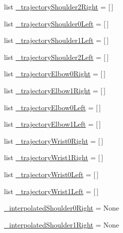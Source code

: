 \begin{DoxyCompactItemize}
\item 
list \mbox{\hyperlink{namespaceinterpolate__steering_a984704ca172938a3761ed9b8233b1003}{\+\_\+trajectory\+Shoulder2\+Right}} = \mbox{[}$\,$\mbox{]}
\item 
list \mbox{\hyperlink{namespaceinterpolate__steering_aafc3bda17692573f1820e027906092e8}{\+\_\+trajectory\+Shoulder0\+Left}} = \mbox{[}$\,$\mbox{]}
\item 
list \mbox{\hyperlink{namespaceinterpolate__steering_a1797f2fa979e7e61df487f39afedd774}{\+\_\+trajectory\+Shoulder1\+Left}} = \mbox{[}$\,$\mbox{]}
\item 
list \mbox{\hyperlink{namespaceinterpolate__steering_ae4675bfff9acc9e5c71a92a7c939e806}{\+\_\+trajectory\+Shoulder2\+Left}} = \mbox{[}$\,$\mbox{]}
\item 
list \mbox{\hyperlink{namespaceinterpolate__steering_adaec758772276334d0523a1e9df71bb3}{\+\_\+trajectory\+Elbow0\+Right}} = \mbox{[}$\,$\mbox{]}
\item 
list \mbox{\hyperlink{namespaceinterpolate__steering_a930787d860b6af317444782ecbee029d}{\+\_\+trajectory\+Elbow1\+Right}} = \mbox{[}$\,$\mbox{]}
\item 
list \mbox{\hyperlink{namespaceinterpolate__steering_a0b98550c1629af1c58085eb4a21257c5}{\+\_\+trajectory\+Elbow0\+Left}} = \mbox{[}$\,$\mbox{]}
\item 
list \mbox{\hyperlink{namespaceinterpolate__steering_af53acb14d7677debb5bfcc89f3655e45}{\+\_\+trajectory\+Elbow1\+Left}} = \mbox{[}$\,$\mbox{]}
\item 
list \mbox{\hyperlink{namespaceinterpolate__steering_a946f9edfdf829439d0735e9a7703de44}{\+\_\+trajectory\+Wrist0\+Right}} = \mbox{[}$\,$\mbox{]}
\item 
list \mbox{\hyperlink{namespaceinterpolate__steering_a0388dd2f0f4832482118ccc63b35080a}{\+\_\+trajectory\+Wrist1\+Right}} = \mbox{[}$\,$\mbox{]}
\item 
list \mbox{\hyperlink{namespaceinterpolate__steering_ab4c6b2b0e31b2792c803045884ca64d9}{\+\_\+trajectory\+Wrist0\+Left}} = \mbox{[}$\,$\mbox{]}
\item 
list \mbox{\hyperlink{namespaceinterpolate__steering_a6cf38b04b4ea5e0ff530451d72caff9b}{\+\_\+trajectory\+Wrist1\+Left}} = \mbox{[}$\,$\mbox{]}
\item 
\mbox{\hyperlink{namespaceinterpolate__steering_af1bbe6fa196193dd3fa6ea0eaf3a95df}{\+\_\+interpolated\+Shoulder0\+Right}} = None
\item 
\mbox{\hyperlink{namespaceinterpolate__steering_ac05de8558d31b99ea2a970506d46c93d}{\+\_\+interpolated\+Shoulder1\+Right}} = None

\end{DoxyCompactItemize}
